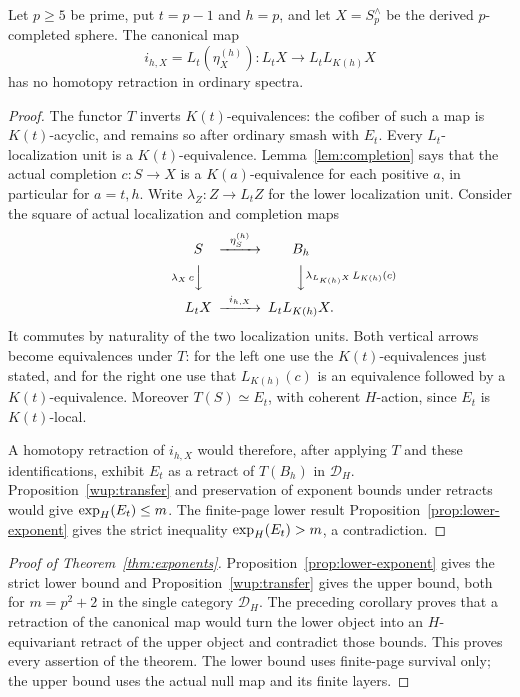 \begin{corollary}
\label{wup:contradiction}
Let \(p\geq5\) be prime, put \(t=p-1\) and \(h=p\), and let
\(X=S^\wedge_p\) be the derived \(p\)-completed sphere. The canonical map
\[
 i_{h,X}=L_t(\eta_X^{(h)}):
 L_tX\longrightarrow L_tL_{K(h)}X
\]
has no homotopy retraction in ordinary spectra.
\end{corollary}

\begin{proof}
The functor \(T\) inverts \(K(t)\)-equivalences: the cofiber of
such a map is \(K(t)\)-acyclic, and remains so after ordinary
smash with \(E_t\). Every \(L_t\)-localization unit is a
\(K(t)\)-equivalence. Lemma~\ref{lem:completion} says that the
actual completion \(c:S\to X\) is a \(K(a)\)-equivalence for
each positive \(a\), in particular for \(a=t,h\).
Write $\lambda_Z:Z\to L_tZ$ for the lower localization unit.
Consider the square of actual localization and completion maps
\[
\begin{CD}
 S @>{\eta_S^{(h)}}>> B_h\\
 @V{\lambda_X\,c}VV
 @VV{\lambda_{L_{K(h)}X}\,L_{K(h)}(c)}V\\
 L_tX @>{i_{h,X}}>> L_tL_{K(h)}X .
\end{CD}
\]
It commutes by naturality of the two localization units.
Both vertical arrows become equivalences under \(T\): for the
left one use the \(K(t)\)-equivalences just stated, and for the
right one use that \(L_{K(h)}(c)\) is an equivalence followed
by a \(K(t)\)-equivalence. Moreover \(T(S)\simeq E_t\), with
coherent \(H\)-action, since \(E_t\) is \(K(t)\)-local.

A homotopy retraction of \(i_{h,X}\) would therefore, after
applying \(T\) and these identifications, exhibit \(E_t\) as a
retract of \(T(B_h)\) in \(\mathcal D_H\).
Proposition~\ref{wup:transfer} and preservation of exponent
bounds under retracts would give
\(\operatorname{exp}_H(E_t)\leq m\). The finite-page lower result
Proposition~\ref{prop:lower-exponent} gives the strict inequality
\(\operatorname{exp}_H(E_t)>m\), a contradiction.
\end{proof}

\begin{proof}[Proof of Theorem~\ref{thm:exponents}]
Proposition~\ref{prop:lower-exponent} gives the strict lower bound and
Proposition~\ref{wup:transfer} gives the upper bound, both for
$m=p^2+2$ in the single category $\mathcal D_H$. The preceding corollary
proves that a retraction of the canonical map would turn the lower object
into an $H$-equivariant retract of the upper object and contradict those
bounds. This proves every assertion of the theorem. The lower bound uses
finite-page survival only; the upper bound uses the actual null map and
its finite layers.
\end{proof}
